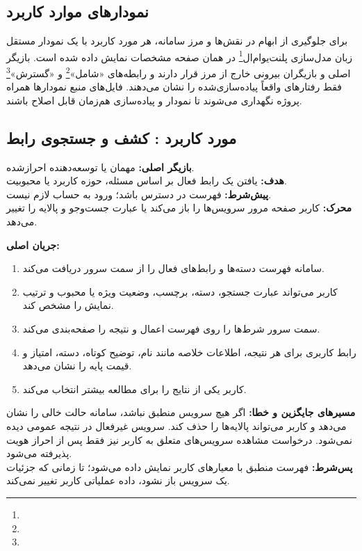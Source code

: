 \subsection{نمودارهای موارد کاربرد}
برای جلوگیری از ابهام در نقش‌ها و مرز سامانه، هر مورد کاربرد با یک نمودار مستقل زبان مدل‌سازی پلنت‌یو‌ام‌ال\footnote{} در همان صفحه مشخصات نمایش داده شده است. بازیگر اصلی و بازیگران بیرونی خارج از مرز  قرار دارند و رابطه‌های «شامل»\footnote{} و «گسترش»\footnote{} فقط رفتارهای واقعاً پیاده‌سازی‌شده را نشان می‌دهند. فایل‌های منبع نمودارها همراه پروژه نگهداری می‌شوند تا نمودار و پیاده‌سازی هم‌زمان قابل اصلاح باشند.

\UseCaseStart
\subsection{مورد کاربرد : کشف و جستجوی رابط}
\noindent\textbf{بازیگر اصلی:} مهمان یا توسعه‌دهنده احرازشده.\\
\textbf{هدف:} یافتن یک رابط فعال بر اساس مسئله، حوزه کاربرد یا محبوبیت.\\
\textbf{پیش‌شرط:} فهرست در دسترس باشد؛ ورود به حساب لازم نیست.\\
\textbf{محرک:} کاربر صفحه مرور سرویس‌ها را باز می‌کند یا عبارت جست‌وجو و پالایه را تغییر می‌دهد.


\noindent\textbf{جریان اصلی:}
\begin{enumerate}
  \item سامانه فهرست دسته‌ها و رابط‌های فعال را از سمت سرور دریافت می‌کند.
  \item کاربر می‌تواند عبارت جستجو، دسته، برچسب، وضعیت ویژه یا محبوب و ترتیب نمایش را مشخص کند.
  \item سمت سرور شرط‌ها را روی فهرست اعمال و نتیجه را صفحه‌بندی می‌کند.
  \item رابط کاربری برای هر نتیجه، اطلاعات خلاصه مانند نام، توضیح کوتاه، دسته، امتیاز و قیمت پایه را نشان می‌دهد.
  \item کاربر یکی از نتایج را برای مطالعه بیشتر انتخاب می‌کند.
\end{enumerate}

\noindent\textbf{مسیرهای جایگزین و خطا:}
اگر هیچ سرویس منطبق نباشد، سامانه حالت خالی را نشان می‌دهد و کاربر می‌تواند پالایه‌ها را حذف کند. سرویس غیرفعال در نتیجه عمومی دیده نمی‌شود. درخواست مشاهده سرویس‌های متعلق به کاربر نیز فقط پس از احراز هویت پذیرفته می‌شود.\\
\textbf{پس‌شرط:} فهرست منطبق با معیارهای کاربر نمایش داده می‌شود؛ تا زمانی که جزئیات یک سرویس باز نشود، داده عملیاتی کاربر تغییر نمی‌کند.

